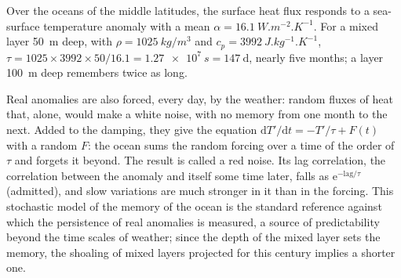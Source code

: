 \begin{example}\label{ex:b2:climate-variability:tau}
Over the oceans of the middle latitudes, the surface heat flux responds to a sea-surface
temperature anomaly with a mean $\alpha = \qty{16.1}{W.m^{-2}.K^{-1}}$. For a mixed layer
\qty{50}{m} deep, with $\rho = \qty{1025}{kg/m^3}$ and $c_p = \qty{3992}{J.kg^{-1}.K^{-1}}$,
$\tau = 1025 \times 3992 \times 50/16.1 = \qty{1.27e7}{s} = \qty{147}{\day}$, nearly five
months; a layer \qty{100}{m} deep remembers twice as long.
\end{example}

Real anomalies are also forced, every day, by the weather: random fluxes of heat that, alone,
would make a white noise, with no memory from one month to the next. Added to the damping, they
give the equation $\mathrm{d}T'/\mathrm{d}t = -T'/\tau + F(t)$ with a random $F$: the ocean sums
the random forcing over a time of the order of $\tau$ and forgets it beyond. The result is called
a red noise. Its lag correlation, the correlation between the anomaly and itself some time later,
falls as $\mathrm{e}^{-\text{lag}/\tau}$ (admitted), and slow variations are much stronger in it
than in the forcing. This stochastic model of the memory of the ocean is the standard reference
against which the persistence of real anomalies is measured, a source of predictability beyond
the time scales of weather; since the depth of the mixed layer sets the memory, the shoaling of
mixed layers projected for this century implies a shorter one.

